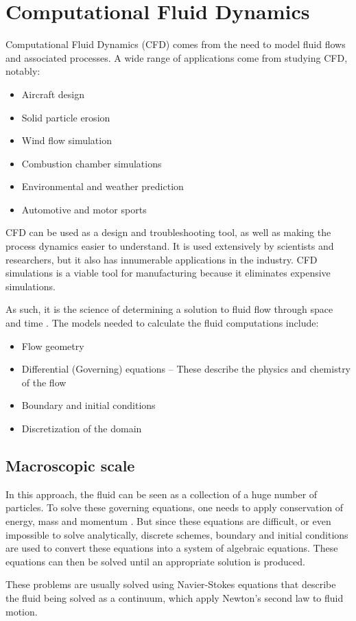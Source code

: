 \documentclass[12pt]{book}
\begin{document}
\section{Computational Fluid Dynamics}
Computational Fluid Dynamics (CFD) comes from the need to model fluid flows and associated processes.
A wide range of applications come from studying CFD, notably:
\begin{itemize}
\item Aircraft design \cite{aircraft_cfd}
\item Solid particle erosion \cite{partic_erosion_cfd}
\item Wind flow simulation \cite{wind_flow_cfd}
\item Combustion chamber simulations \cite{combust_cfd}
\item Environmental and weather prediction \cite{weather_pred}
\item Automotive and motor sports \cite{america_cup,race_car_wing}
\end{itemize}

CFD can be used as a design and troubleshooting tool, as well as making the process dynamics easier to understand. It is used extensively by scientists and researchers, but it also has innumerable applications in the industry. CFD simulations is a viable tool for manufacturing because it eliminates expensive simulations.\par
 As such, it is the science of determining a solution to fluid flow through space and time \cite{cfd_present}. The models needed to calculate the fluid computations include:
\begin{itemize}
\item	Flow geometry
\item	Differential (Governing) equations – These describe the physics and chemistry of the flow
\item Boundary and initial conditions
\item	Discretization of the domain
\end{itemize}



\subsection{Macroscopic scale}
In this approach, the fluid can be seen as a collection of a huge number of particles. To solve these governing equations, one needs to apply conservation of energy, mass and momentum \cite{lbm_springer}. But since these equations are difficult, or even impossible to solve analytically, discrete schemes, boundary and initial conditions are used to convert these equations into a system of algebraic equations. These equations can then be solved until an appropriate solution is produced. 
\par These problems are usually solved using Navier-Stokes equations that describe the fluid being solved as a continuum, which apply Newton's second law to fluid motion.
\end{document}
